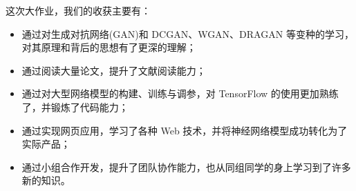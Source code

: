 \documentclass[a4paper,12pt,UTF8]{ctexart}
\begin{document}
这次大作业，我们的收获主要有：
\begin{itemize}
  \item 通过对生成对抗网络(GAN)和 DCGAN、WGAN、DRAGAN 等变种的学习，对其原理和背后的思想有了更深的理解；
  \item 通过阅读大量论文，提升了文献阅读能力；
  \item 通过对大型网络模型的构建、训练与调参，对 TensorFlow 的使用更加熟练了，并锻炼了代码能力；
  \item 通过实现网页应用，学习了各种 Web 技术，并将神经网络模型成功转化为了实际产品；
  \item 通过小组合作开发，提升了团队协作能力，也从同组同学的身上学习到了许多新的知识。
\end{itemize}

\medskip

{\small


}
\end{document}
